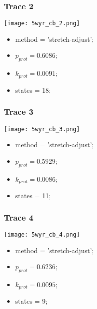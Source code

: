 \subsubsection{Trace 2}
\begin{minipage}[c]{0.7\textwidth}
    \texttt{[image: 5wyr\_cb\_2.png]}
\end{minipage}
\hfill
\begin{minipage}[c]{0.45\textwidth}
    \begin{itemize}
        \item method = 'stretch-adjust';
        \item $p_{prot}=0.6086$;
        \item $k_{prot}=0.0091$;
        \item states = 18;
    \end{itemize}
\end{minipage}

\subsubsection{Trace 3}
\begin{minipage}[c]{0.7\textwidth}
    \texttt{[image: 5wyr\_cb\_3.png]}
\end{minipage}
\hfill
\begin{minipage}[c]{0.45\textwidth}
    \begin{itemize}
        \item method = 'stretch-adjust';
        \item $p_{prot}=0.5929$;
        \item $k_{prot}=0.0086$;
        \item states = 11;
    \end{itemize}
\end{minipage}

\subsubsection{Trace 4}
\begin{minipage}[c]{0.7\textwidth}
    \texttt{[image: 5wyr\_cb\_4.png]}
\end{minipage}
\hfill
\begin{minipage}[c]{0.45\textwidth}
    \begin{itemize}
        \item method = 'stretch-adjust';
        \item $p_{prot}=0.6236$;
        \item $k_{prot}=0.0095$;
        \item states = 9;
    \end{itemize}
\end{minipage}

